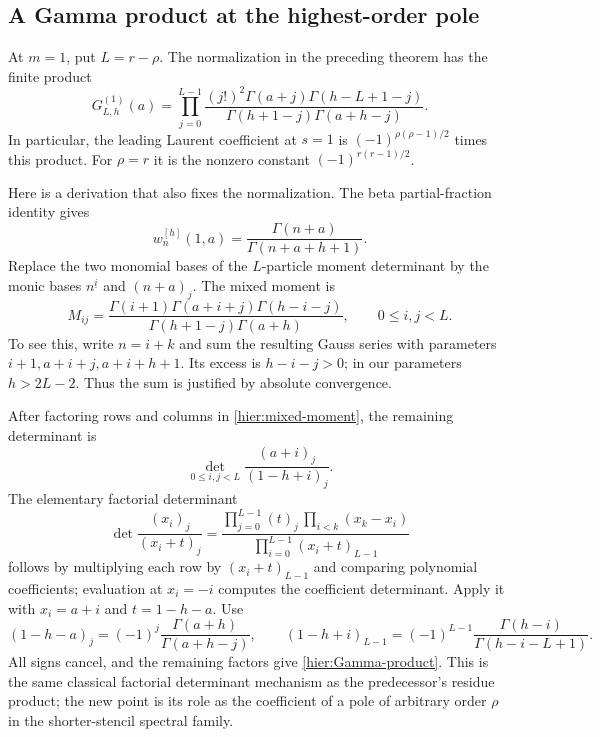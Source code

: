 \subsection{A Gamma product at the highest-order pole}

At $m=1$, put $L=r-\rho$.  The normalization in the preceding theorem
has the finite product
\begin{equation}\label{hier:Gamma-product}
 \boxed{\displaystyle
 G_{L,h}^{(1)}(a)=
 \prod_{j=0}^{L-1}
 \frac{(j!)^2\Gamma(a+j)\Gamma(h-L+1-j)}
      {\Gamma(h+1-j)\Gamma(a+h-j)}.}
\end{equation}
In particular, the leading Laurent coefficient at $s=1$ is
$(-1)^{\rho(\rho-1)/2}$ times this product.  For $\rho=r$ it is
the nonzero constant $(-1)^{r(r-1)/2}$.

Here is a derivation that also fixes the normalization.  The beta
partial-fraction identity gives
\[
 w_n^{[h]}(1,a)=\frac{\Gamma(n+a)}{\Gamma(n+a+h+1)}.
\]
Replace the two monomial bases of the $L$-particle moment determinant
by the monic bases $n^{\underline i}$ and $(n+a)_j$.  The mixed
moment is
\begin{equation}\label{hier:mixed-moment}
 M_{ij}=\frac{\Gamma(i+1)\Gamma(a+i+j)\Gamma(h-i-j)}
                  {\Gamma(h+1-j)\Gamma(a+h)},
 \qquad 0\le i,j<L.
\end{equation}
To see this, write $n=i+k$ and sum the resulting Gauss series with
parameters $i+1,a+i+j,a+i+h+1$.  Its excess is $h-i-j>0$;
in our parameters $h>2L-2$.  Thus the sum is justified by absolute
convergence.

After factoring rows and columns in \eqref{hier:mixed-moment}, the
remaining determinant is
\[
 \det_{0\le i,j<L}\frac{(a+i)_j}{(1-h+i)_j}.
\]
The elementary factorial determinant
\[
 \det\frac{(x_i)_j}{(x_i+t)_j}
 =\frac{\prod_{j=0}^{L-1}(t)_j\,
             \prod_{i<k}(x_k-x_i)}
            {\prod_{i=0}^{L-1}(x_i+t)_{L-1}}
\]
follows by multiplying each row by $(x_i+t)_{L-1}$ and comparing
polynomial coefficients; evaluation at $x_i=-i$ computes the
coefficient determinant.  Apply it with $x_i=a+i$ and $t=1-h-a$.
Use
\[
 (1-h-a)_j=(-1)^j\frac{\Gamma(a+h)}{\Gamma(a+h-j)},\qquad
 (1-h+i)_{L-1}=(-1)^{L-1}
                    \frac{\Gamma(h-i)}{\Gamma(h-i-L+1)}.
\]
All signs cancel, and the remaining factors give
\eqref{hier:Gamma-product}.  This is the same classical factorial
determinant mechanism as the predecessor's residue product; the new
point is its role as the coefficient of a pole of arbitrary order
$\rho$ in the shorter-stencil spectral family.

